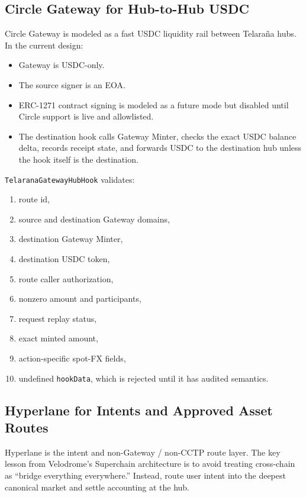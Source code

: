 \documentclass[11pt]{article}
\newcommand{\protocol}{Telara\~na}
\begin{document}
\subsection{Circle Gateway for Hub-to-Hub USDC}

Circle Gateway is modeled as a fast USDC liquidity rail between \protocol{}
hubs. In the current design:

\begin{itemize}
  \item Gateway is USDC-only.
  \item The source signer is an EOA.
  \item ERC-1271 contract signing is modeled as a future mode but disabled
        until Circle support is live and allowlisted.
  \item The destination hook calls Gateway Minter, checks the exact USDC
        balance delta, records receipt state, and forwards USDC to the
        destination hub unless the hook itself is the destination.
\end{itemize}

\texttt{TelaranaGatewayHubHook} validates:

\begin{enumerate}
  \item route id,
  \item source and destination Gateway domains,
  \item destination Gateway Minter,
  \item destination USDC token,
  \item route caller authorization,
  \item nonzero amount and participants,
  \item request replay status,
  \item exact minted amount,
  \item action-specific spot-FX fields,
  \item undefined \texttt{hookData}, which is rejected until it has audited
        semantics.
\end{enumerate}

\subsection{Hyperlane for Intents and Approved Asset Routes}

Hyperlane is the intent and non-Gateway / non-CCTP route layer. The key lesson
from Velodrome's Superchain architecture is to avoid treating cross-chain as
``bridge everything everywhere.'' Instead, route user intent into the deepest
canonical market and settle accounting at the hub.
\end{document}
